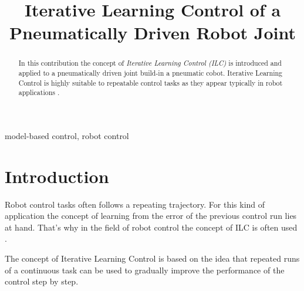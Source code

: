 \documentclass[conference]{IEEEtran}
\begin{document}
\title{Iterative Learning Control of a Pneumatically Driven Robot Joint\\
}

\author{
\and
{}
}

\maketitle

\begin{abstract}
  In this contribution the concept of {\em Iterative Learning Control
    (ILC)} is introduced and applied to a pneumatically driven joint
  build-in a pneumatic cobot. Iterative Learning Control is highly
  suitable to repeatable control tasks as they appear typically in
  robot applications \cite{Longman2000}.
\end{abstract}

\begin{IEEEkeywords}
model-based control, robot control
\end{IEEEkeywords}

\section{Introduction}
Robot control tasks often follows a repeating trajectory. For this
kind of application the concept of learning from the error of the
previous control run lies at hand. That's why in the field of robot
control the concept of ILC is often used \cite{AhnChenEtAl2007}.

The concept of Iterative Learning Control is based on the idea that
repeated runs of a continuous task can be used to gradually improve
the performance of the control step by step.
\end{document}
